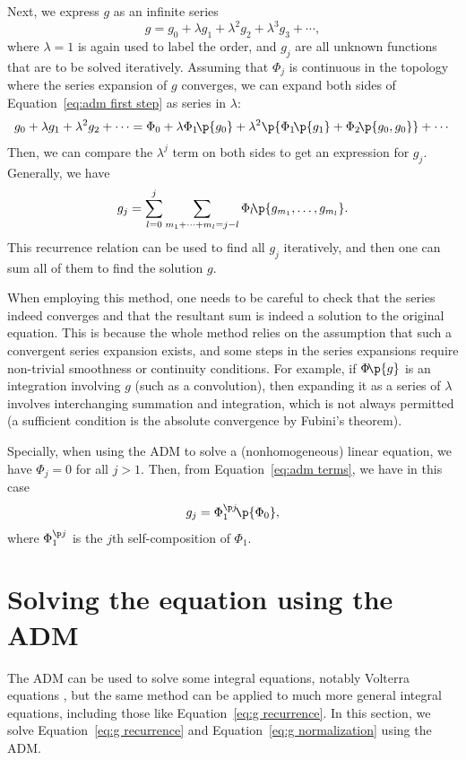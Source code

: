 \documentclass[oneside,12pt,final]{ucthesis-CA2012}
\newcommand{\lmd}{\lambda}
\newcommand{\fc}[2]{#1\mathchoice{\!}{\!}{}{}\p{#2}} %
\begin{document}
\begin{mainmatter}
Next, we express $g$ as an infinite series
\[g=g_0+\lmd g_1+\lmd^2 g_2+\lmd^3 g_3+\cdots,\]
where $\lmd=1$ is again used to label the order,
and $g_j$ are all unknown functions that are to be solved iteratively.
Assuming that $\Phi_j$ is continuous in the topology
where the series expansion of $g$ converges,
we can expand both sides of Equation~\ref{eq:adm first step} as series in $\lmd$:
\[g_0+\lmd g_1+\lmd^2g_2+\cdots
=\Phi_0+\lmd\fc{\Phi_1}{g_0}
+\lmd^2\p{\fc{\Phi_1}{g_1}+\fc{\Phi_2}{g_0,g_0}}+\cdots\]
Then, we can compare the $\lmd^j$ term on both sides to get an expression for $g_j$.
Generally, we have \cite[p.~11]{Adomian_1994}
\begin{equation}
	\label{eq:adm terms}
	g_j=\sum_{l=0}^j\sum_{m_1+\cdots+m_l=j-l}\fc{\Phi_l}{g_{m_1},\ldots,g_{m_l}}.
\end{equation}
This recurrence relation can be used to find all $g_j$ iteratively,
and then one can sum all of them to find the solution $g$.

When employing this method, one needs to be careful to check that
the series indeed converges and that the resultant sum is indeed a solution to the original equation.
This is because the whole method relies on the assumption that such a convergent series expansion exists,
and some steps in the series expansions require non-trivial smoothness or continuity conditions.
For example, if $\fc{\Phi}g$ is an integration involving $g$ (such as a convolution),
then expanding it as a series of $\lmd$ involves interchanging summation and integration,
which is not always permitted (a sufficient condition is the absolute convergence by Fubini's theorem).

Specially, when using the ADM to solve a (nonhomogeneous) linear equation,
we have $\Phi_j=0$ for all $j>1$.
Then, from Equation~\ref{eq:adm terms}, we have in this case
\begin{equation}
	\label{eq:linear adm}
	g_j=\fc{\Phi_1^{\p j}}{\Phi_0},
\end{equation}
where $\Phi_1^{\p j}$ is the $j$th self-composition of $\Phi_1$.

\chapter{Solving the equation using the ADM}
\label{sec:solve}

The ADM can be used to solve some integral equations, notably Volterra equations \cite[p.~224]{Adomian_1994},
but the same method can be applied to much more general integral equations,
including those like Equation~\ref{eq:g recurrence}.
In this section, we solve Equation~\ref{eq:g recurrence} and Equation~\ref{eq:g normalization} using the ADM\@.


\end{mainmatter}
\end{document}
